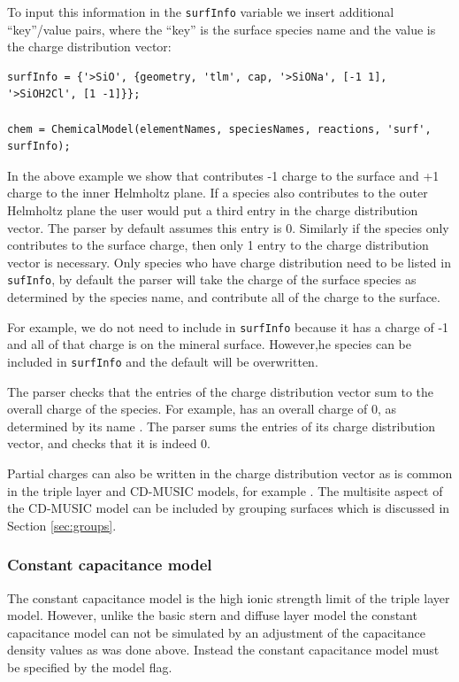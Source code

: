 \documentclass{article}
\begin{document}
To input this information in the \verb|surfInfo| variable we insert additional ``key''/value pairs, where the ``key'' is the surface species name and the value is the charge distribution vector:

\begin{lstlisting}
surfInfo = {'>SiO', {geometry, 'tlm', cap, '>SiONa', [-1 1], '>SiOH2Cl', [1 -1]}};

chem = ChemicalModel(elementNames, speciesNames, reactions, 'surf', surfInfo);
\end{lstlisting}
In the above example we show that  contributes -1 charge to the surface and +1 charge to the inner Helmholtz plane. If a species also contributes to the outer Helmholtz plane the user would put a third entry in the charge distribution vector. The parser by default assumes this entry is 0. Similarly if the species only contributes to the surface charge, then only 1 entry to the charge distribution vector is necessary. Only species who have charge distribution need to be listed in \verb|sufInfo|, by default the parser will take the charge of the surface species as determined by the species name,  and contribute all of the charge to the surface. 

For example, we do not need to include  in \verb|surfInfo| because it has a charge of -1 and all of that charge is on the mineral surface. However,he species can be included in \verb|surfInfo| and the default will be overwritten.

The parser checks that the entries of the charge distribution vector sum to the overall charge of the species. For example,  has an overall charge of 0, as determined by its name . The parser sums the entries of its charge distribution vector, \mcode{[1 -1]} and checks that it is indeed 0. 

Partial charges can also be written in the charge distribution vector as is common in the triple layer and CD-MUSIC models, for example \mcode{[0.5 -1]}. The multisite aspect of the CD-MUSIC model can be included by grouping surfaces which is discussed in Section \ref{sec:groups}. 

\subsubsection{Constant capacitance model}
The constant capacitance model is the high ionic strength limit of the triple layer model. However, unlike the basic stern and diffuse layer model the constant capacitance model can not be simulated by an adjustment of the capacitance density values as was done above. Instead the constant capacitance model must be specified by the  model flag.
\end{document}

